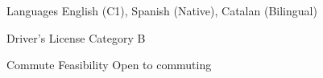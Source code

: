 

\begin{cvskills}

\cvskill
  {Languages}
  {English (C1), Spanish (Native), Catalan (Bilingual)}

\cvskill
  {Driver's License}
  {Category B}

\cvskill
  {Commute Feasibility}
  {Open to commuting}

\end{cvskills}
